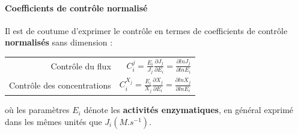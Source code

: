 \paragraph{Coefficients de contrôle normalisé}

Il est de coutume d'exprimer le contrôle en termes de coefficients de contrôle \textbf{normalisés} sans dimension :

\begin{tabular}{rr}
	Contrôle du flux	&	$C_i^j = \frac{E_i}{J_j} \frac{\partial J_j}{\partial E_i } = \frac{\partial ln J_j}{\partial ln E_i}$ \\
	Contrôle des concentrations	&	$C_i^{X_j} = \frac{E_i}{X_j} \frac{\partial X_j}{\partial E_i } = \frac{\partial ln X_j}{\partial ln E_i}	$ \\
\end{tabular}

où les paramètres $E_i$ dénote les \textbf{activités enzymatiques}, en général exprimé dans les mêmes unités que $J_i (M.s^{-1})$.

